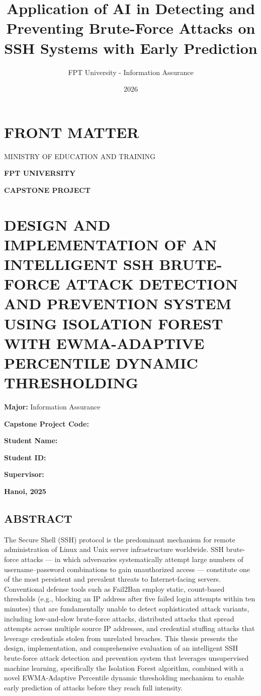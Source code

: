 \documentclass[
  a4paper]{report}
\title{Application of AI in Detecting and Preventing Brute-Force Attacks
on SSH Systems with Early Prediction}
\author{FPT University - Information Assurance}
\date{2026}
\begin{document}
\maketitle

{
\setcounter{tocdepth}{2}
\tableofcontents
}
\chapter{FRONT MATTER}\label{front-matter}

MINISTRY OF EDUCATION AND TRAINING

\textbf{FPT UNIVERSITY}

\textbf{CAPSTONE PROJECT}

\chapter{DESIGN AND IMPLEMENTATION OF AN INTELLIGENT SSH BRUTE-FORCE
ATTACK DETECTION AND PREVENTION SYSTEM USING ISOLATION FOREST WITH
EWMA-ADAPTIVE PERCENTILE DYNAMIC
THRESHOLDING}\label{design-and-implementation-of-an-intelligent-ssh-brute-force-attack-detection-and-prevention-system-using-isolation-forest-with-ewma-adaptive-percentile-dynamic-thresholding}

\textbf{Major:} Information Assurance

\textbf{Capstone Project Code:}

\textbf{Student Name:}

\textbf{Student ID:}

\textbf{Supervisor:}

\textbf{Hanoi, 2025}

\section{ABSTRACT}\label{abstract}

The Secure Shell (SSH) protocol is the predominant mechanism for remote
administration of Linux and Unix server infrastructure worldwide. SSH
brute-force attacks --- in which adversaries systematically attempt
large numbers of username--password combinations to gain unauthorized
access --- constitute one of the most persistent and prevalent threats
to Internet-facing servers. Conventional defense tools such as Fail2Ban
employ static, count-based thresholds (e.g., blocking an IP address
after five failed login attempts within ten minutes) that are
fundamentally unable to detect sophisticated attack variants, including
low-and-slow brute-force attacks, distributed attacks that spread
attempts across multiple source IP addresses, and credential stuffing
attacks that leverage credentials stolen from unrelated breaches. This
thesis presents the design, implementation, and comprehensive evaluation
of an intelligent SSH brute-force attack detection and prevention system
that leverages unsupervised machine learning, specifically the Isolation
Forest algorithm, combined with a novel EWMA-Adaptive Percentile dynamic
thresholding mechanism to enable early prediction of attacks before they
reach full intensity.
\end{document}
